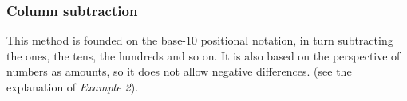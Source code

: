\subsubsection{Column subtraction}
This method is founded on the base-10 positional notation, in turn subtracting the ones, the tens, the hundreds and so on. It is also based on the perspective of numbers as amounts, so it does not allow negative differences. (see the explanation of \textsl{Example 2}).
\begin{center}
	\parbox{0.3\linewidth}{
} \qquad
\parbox{0.3\linewidth}{
} \\[12pt]
\parbox{0.3\linewidth}{
}\qquad
\parbox{0.3\linewidth}{
}

\end{center}
